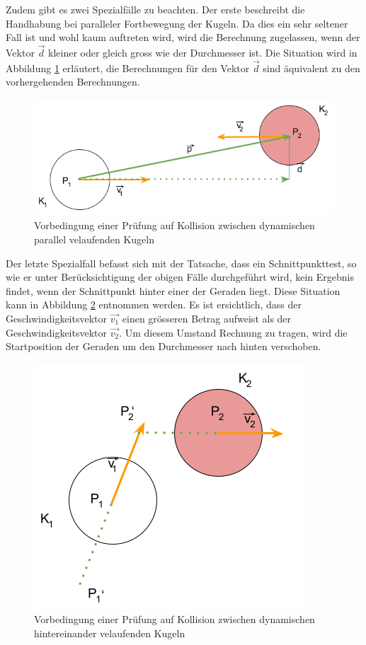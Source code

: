 Zudem gibt es zwei Spezialfälle zu beachten. Der erste beschreibt die Handhabung bei paralleler Fortbewegung
der Kugeln. Da dies ein sehr seltener Fall ist und
wohl kaum auftreten wird, wird die Berechnung zugelassen, wenn der Vektor $\vec{d}$ kleiner oder gleich gross
wie der Durchmesser ist. Die Situation wird in Abbildung \ref{fig:kugelkollision_vorbedingung_dynamisch_parallel} erläutert, die Berechnungen für den Vektor $\vec{d}$
sind äquivalent zu den vorhergehenden Berechnungen.
\begin{figure}[h!]
    \begin{center}
        \includegraphics[width=0.4\linewidth]{../common/03_billiard_ai/resources/26_vorbedingung_kugelkollision_dynamisch_parallel.png}
    \end{center}
    \caption{Vorbedingung einer Prüfung auf Kollision zwischen dynamischen parallel velaufenden Kugeln}
    \label{fig:kugelkollision_vorbedingung_dynamisch_parallel}
\end{figure}

Der letzte Spezialfall befasst sich mit der Tatsache, dass ein Schnittpunkttest, so wie er unter Berücksichtigung der
obigen Fälle durchgeführt wird, kein Ergebnis findet, wenn der Schnittpunkt hinter einer der Geraden liegt.
Diese Situation kann in Abbildung \ref{fig:kugelkollision_vorbedingung_dynamisch_hintereinander} entnommen werden.
Es ist ersichtlich, dass der Geschwindigkeitsvektor $\vec{v_1}$ einen grösseren Betrag aufweist als der
Geschwindigkeitsvektor $\vec{v_2}$. Um diesem Umstand Rechnung zu tragen, wird die Startposition der Geraden um den
Durchmesser nach hinten verschoben.
\begin{figure}[h!]
    \begin{center}
        \includegraphics[width=0.4\linewidth]{../common/03_billiard_ai/resources/27_vorbedingung_kugelkollision_dynamisch_hintereinander.png}
    \end{center}
    \caption{Vorbedingung einer Prüfung auf Kollision zwischen dynamischen hintereinander velaufenden Kugeln}
    \label{fig:kugelkollision_vorbedingung_dynamisch_hintereinander}
\end{figure}

